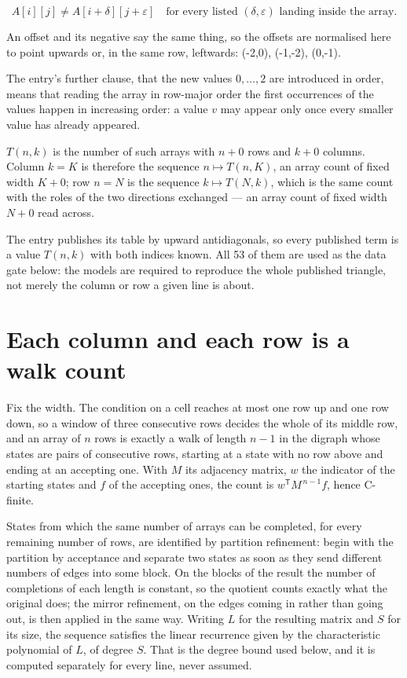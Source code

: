 \documentclass[11pt]{article}
\theoremstyle{definition}
\begin{document}
\[A[i][j] \ne A[i{+}\delta][j{+}\varepsilon]\quad\text{for every listed }(\delta,\varepsilon)\text{ landing inside the array.}\]

An offset and its negative say the same thing, so the offsets are normalised here to point upwards or, in the same row, leftwards: (-2,0), (-1,-2), (0,-1).

The entry's further clause, that the new values $0,\dots,2$ are introduced in order, means that reading the array in row-major order the first occurrences of the values happen in increasing order: a value $v$ may appear only once every smaller value has already appeared.

$T(n,k)$ is the number of such arrays with $n + 0$ rows and $k + 0$ columns. Column $k = K$ is therefore the sequence $n \mapsto T(n,K)$, an array count of fixed width $K + 0$; row $n = N$ is the sequence $k \mapsto T(N,k)$, which is the same count with the roles of the two directions exchanged --- an array count of fixed width $N + 0$ read across.

The entry publishes its table by upward antidiagonals, so every published term is a value $T(n,k)$ with both indices known. All 53 of them are used as the data gate below: the models are required to reproduce the whole published triangle, not merely the column or row a given line is about.

\section{Each column and each row is a walk count}

Fix the width. The condition on a cell reaches at most one row up and one row down, so a window of three consecutive rows decides the whole of its middle row, and an array of $n$ rows is exactly a walk of length $n-1$ in the digraph whose states are pairs of consecutive rows, starting at a state with no row above and ending at an accepting one. With $M$ its adjacency matrix, $w$ the indicator of the starting states and $f$ of the accepting ones, the count is $w^{\mathsf T}M^{\,n-1}f$, hence C-finite.

States from which the same number of arrays can be completed, for every remaining number of rows, are identified by partition refinement: begin with the partition by acceptance and separate two states as soon as they send different numbers of edges into some block. On the blocks of the result the number of completions of each length is constant, so the quotient counts exactly what the original does; the mirror refinement, on the edges coming in rather than going out, is then applied in the same way. Writing $L$ for the resulting matrix and $S$ for its size, the sequence satisfies the linear recurrence given by the characteristic polynomial of $L$, of degree $S$. That is the degree bound used below, and it is computed separately for every line, never assumed.
\end{document}
